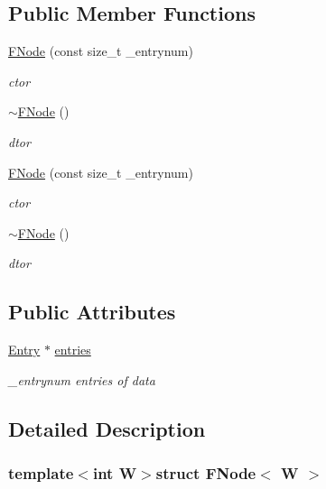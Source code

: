 \subsection*{Public Member Functions}
\begin{DoxyCompactItemize}
\item 
\hyperlink{structFNode_a0896da5de02e460acda8e329eeb71dc4}{F\-Node} (const size\-\_\-t \-\_\-entrynum)
\begin{DoxyCompactList}\small\item\em ctor \end{DoxyCompactList}\item 
\hyperlink{structFNode_a7dde414809e4b298f8368641004e2e22}{$\sim$\-F\-Node} ()
\begin{DoxyCompactList}\small\item\em dtor \end{DoxyCompactList}\item 
\hyperlink{structFNode_a0896da5de02e460acda8e329eeb71dc4}{F\-Node} (const size\-\_\-t \-\_\-entrynum)
\begin{DoxyCompactList}\small\item\em ctor \end{DoxyCompactList}\item 
\hyperlink{structFNode_a7dde414809e4b298f8368641004e2e22}{$\sim$\-F\-Node} ()
\begin{DoxyCompactList}\small\item\em dtor \end{DoxyCompactList}\end{DoxyCompactItemize}
\subsection*{Public Attributes}
\begin{DoxyCompactItemize}
\item 
\hyperlink{structFNode_1_1Entry}{Entry} $\ast$ \hyperlink{structFNode_ae0cdd65542d8630a94e5405203b2b951}{entries}
\begin{DoxyCompactList}\small\item\em \-\_\-entrynum entries of data \end{DoxyCompactList}\end{DoxyCompactItemize}


\subsection{Detailed Description}
\subsubsection*{template$<$int W$>$struct F\-Node$<$ W $>$}

